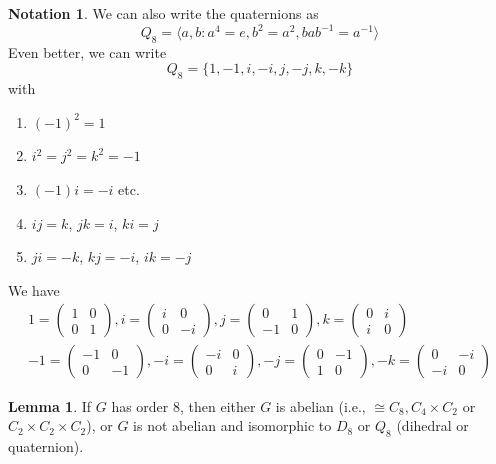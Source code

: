 \documentclass[a4paper]{article}
\theoremstyle{definition}
\newtheorem*{lemma}{Lemma}
\newtheorem*{notation}{Notation}
\newcommand{\bra}{\langle}
\newcommand{\ket}{\rangle}
\begin{document}
\begin{notation}
  We can also write the quaternions as
  \[
  Q_8 = \bra a, b : a^4 = e, b^2 = a^2, bab^{-1} = a^{-1}\ket
  \]
  Even better, we can write
  \[
  Q_8 = \{1, -1, i, -i, j, -j, k, -k\}
  \]
  with
  \begin{enumerate}
  \item $(-1)^2 = 1$
  \item $i^2 = j^2 = k^2 = -1$
  \item $(-1)i = -i$ etc.
  \item $ij = k$, $jk = i$, $ki = j$
  \item $ji = -k$, $kj = -i$, $ik = -j$
  \end{enumerate}
  We have
  \begin{gather*}
    1 = \begin{pmatrix}
      1&0\\0&1
    \end{pmatrix}, 
    i = \begin{pmatrix}
      i & 0\\0&-i
    \end{pmatrix},
    j = \begin{pmatrix}
      0&1\\-1&0
    \end{pmatrix},
    k = \begin{pmatrix}
      0&i\\i&0
    \end{pmatrix}\\
    -1 = \begin{pmatrix}
      -1&0\\0&-1
    \end{pmatrix}, 
    -i = \begin{pmatrix}
      -i & 0\\0&i
    \end{pmatrix},
    -j = \begin{pmatrix}
      0&-1\\1&0
    \end{pmatrix},
    -k = \begin{pmatrix}
      0&-i\\-i&0
    \end{pmatrix}
  \end{gather*}
\end{notation}

\begin{lemma}
  If $G$ has order 8, then either $G$ is abelian (i.e., $\cong C_8, C_4\times C_2$ or $C_2\times C_2\times C_2$), or $G$ is not abelian and isomorphic to $D_8$ or $Q_8$ (dihedral or quaternion).
\end{lemma}
\end{document}
